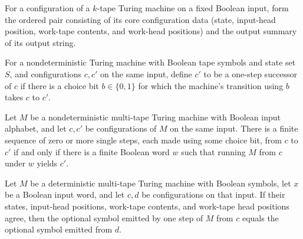 \begin{definition}
\label{Turing.NDTM.coreSum}
\leanok
{}
For a configuration of a $k$-tape Turing machine on a fixed Boolean input, form the
ordered pair consisting of its core configuration data (state, input-head position,
work-tape contents, and work-head positions) and the output summary of its output
string.
\end{definition}

\begin{definition}
\label{Turing.NDTM.CfgStep}
\leanok
{}
For a nondeterministic Turing machine with Boolean tape symbols and state set $S$, and
configurations $c,c'$ on the same input, define $c'$ to be a one-step successor of $c$
if there is a choice bit $b\in\{0,1\}$ for which the machine's transition using $b$
takes $c$ to $c'$.
\end{definition}

\begin{theorem}
\label{Turing.NDTM.reflTransGen_cfgStep_iff}
\leanok
{}
Let $M$ be a nondeterministic multi-tape Turing machine with Boolean input alphabet, and
let $c,c'$ be configurations of $M$ on the same input. There is a finite sequence of
zero or more single steps, each made using some choice bit, from $c$ to $c'$ if and only
if there is a finite Boolean word $w$ such that running $M$ from $c$ under $w$ yields
$c'$.
\end{theorem}

\begin{theorem}
\label{Turing.NDTM.outputSymbol_congr}
\leanok
{}
Let $M$ be a deterministic multi-tape Turing machine with Boolean symbols, let $x$ be a
Boolean input word, and let $c,d$ be configurations on that input. If their states,
input-head positions, work-tape contents, and work-tape head positions agree, then the
optional symbol emitted by one step of $M$ from $c$ equals the optional symbol emitted
from $d$.
\end{theorem}

